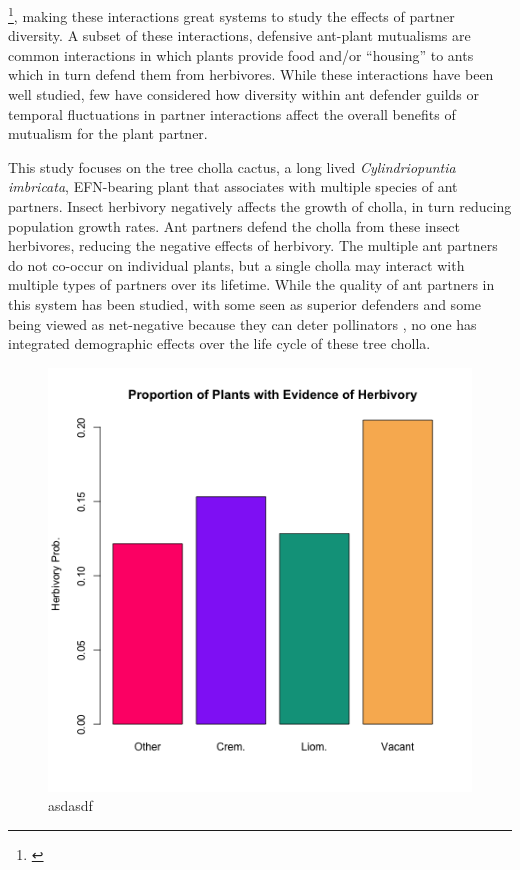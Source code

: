 \documentclass[12pt,a4paper]{article}
\newcommand{\ali}[2]{{\color{pink}{#1}}\footnote{\textit{\color{pink}{#2}}}}
\begin{document}
\ali{Ant visitation to extra-floral nectar producing plants are a classic and well-studied example of interspecific mutualisms which are often multispecies and have dynamic turnover patterns}{... Is this a better transition? I tried to tie it in a bit more conceptually.}, making these interactions great systems to study the effects of partner diversity.
A subset of these interactions, defensive ant-plant mutualisms are common interactions in which plants provide food and/or ``housing'' to ants which in turn defend them from herbivores\cite{Bronstein1998, Bronstein2006}. 
While these interactions have been well studied\cite{Ness2006,Beattie1985,Schultheiss2022}, few have considered how diversity within ant defender guilds\cite{Stanton2013} or temporal fluctuations in partner interactions\cite{Trøjelsgaard2015} affect the overall benefits of mutualism for the plant partner.

This study focuses on the tree cholla cactus, a long lived \textit{Cylindriopuntia imbricata}, EFN-bearing plant that associates with multiple species of ant partners.
Insect herbivory negatively affects the growth of cholla, in turn reducing population growth rates\cite{Miller2009}. 
Ant partners defend the cholla from these insect herbivores, reducing the negative effects of herbivory\cite{Miller2007}. 
The multiple ant partners do not co-occur on individual plants, but a single cholla may interact with multiple types of partners over its lifetime.
While the quality of ant partners in this system has been studied, with some seen as superior defenders and some  being viewed as net-negative because they can deter pollinators \cite{Ohm2014}, no one has integrated demographic effects over the life cycle of these tree cholla.


\begin{figure}[h]
	\includegraphics[width=.8\linewidth]{herb_ant_only_flow.png}
	\caption{asdasdf}
	\label{fig:herb}
\end{figure}
\end{document}
